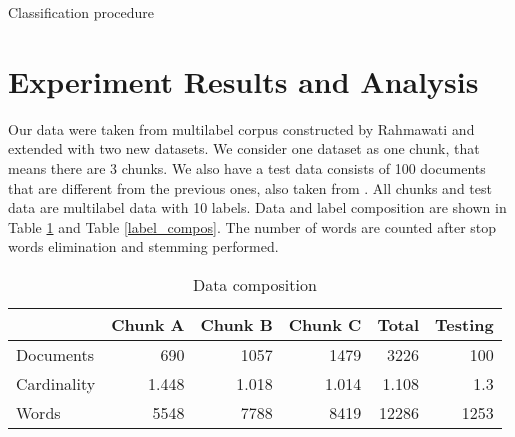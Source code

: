 \documentclass[conference]{IEEEtran}
\makeatletter
\def\BState{\State\hskip-\ALG@thistlm}
\newcommand{\argmax}{\arg\!\max}
\makeatother
\begin{document}
\begin{algorithm}[!htb]
\caption{Classification procedure}
\label{algo_classify}
\end{algorithm}

\section{Experiment Results and Analysis}

Our data were taken from multilabel corpus constructed by Rahmawati \cite{rahma} and extended with two new datasets.
We consider one dataset as one chunk, that means there are 3 chunks.
We also have a test data consists of 100 documents that are different from the previous ones, also taken from \cite{rahma}.
All chunks and test data are multilabel data with 10 labels.
Data and label composition are shown in Table \ref{data_compos} and Table \ref{label_compos}.
The number of words are counted after stop words elimination and stemming performed.

\begin{table}[!htb]
\renewcommand{\arraystretch}{1.3}
\caption{Data composition}
\label{data_compos}
\centering
\begin{tabular}{|l|r|r|r|r|r|}
    \hline
     & Chunk A & Chunk B & Chunk C & \textbf{Total} & Testing\\
    \hline
    Documents & 690 & 1057 & 1479 & 3226 & 100\\
    \hline
    Cardinality & 1.448 & 1.018 & 1.014 & 1.108 & 1.3\\
    \hline
    Words & 5548 & 7788 & 8419 & 12286 & 1253\\
    \hline
\end{tabular}
\end{table}
\end{document}
